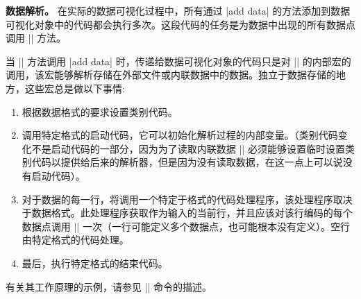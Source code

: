 \begin{command}{\pgfdata{}}
    \textbf{数据解析。} 在实际的数据可视化过程中，所有通过 |add data| 的方法添加到数据可视化对象中的代码都会执行多次。这段代码的任务是为数据中出现的所有数据点调用 |\pgfdatapoint| 方法。


    当 |\pgfdata| 方法调用 |add data| 时，传递给数据可视化对象的代码只是对 |\pgfdata| 的内部宏的调用，该宏能够解析存储在外部文件或内联数据中的数据。独立于数据存储的地方，这些宏总是做以下事情:
    \begin{enumerate}
        \item 根据数据格式的要求设置类别代码。
        \item 调用特定格式的启动代码，它可以初始化解析过程的内部变量。（类别代码变化不是启动代码的一部分，因为为了读取内联数据 |\pgfdata| 必须能够设置临时设置类别代码以提供给后来的解析器，但是因为没有读取数据，在这一点上可以说没有启动代码）。
        \item 对于数据的每一行，将调用一个特定于格式的代码处理程序，该处理程序取决于数据格式。此处理程序获取作为输入的当前行，并且应该对该行编码的每个数据点调用 |\pgfdatapoint| 一次（一行可能定义多个数据点，也可能根本没有定义）。空行由特定格式的代码处理。
        \item 最后，执行特定格式的结束代码。
    \end{enumerate}
    有关其工作原理的示例，请参见 |\pgfdeclaredataformat| 命令的描述。



\end{command}
